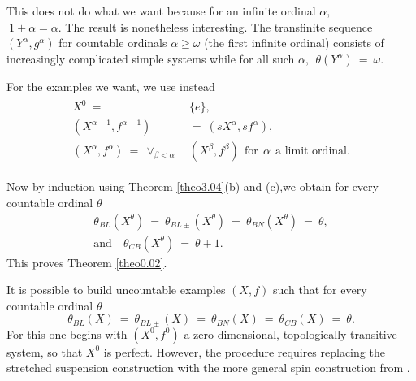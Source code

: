 \documentclass[12pt]{amsart}
\def \a {\alpha }
\def \b {\beta}
\def \om {\omega}
\def \th {\theta}
\numberwithin{equation}{section}
\begin{document}
 This does not do what we want because for an infinite ordinal $\a,$ \\ $ \ 1 + \a = \a$. The result is nonetheless interesting.
The transfinite sequence $(Y^{\a},g^{\a})$ for countable ordinals $\a \ge \om$ (the first infinite ordinal) consists of increasingly complicated
simple systems while for all such $\a, \ \ \th(Y^{\a}) \ = \ \om$.

For the examples we want, we use instead
\begin{align}\label{eq3.07}\begin{split}
X^0 \  = \ & \{ e \},  \\
(X^{\a+1},f^{\a+1}) \ & = \ (sX^{\a},sf^{\a}),  \\
(X^{\a}, f^{\a}) \  = \ \vee_{\b < \a} \  & ( X^{\b},  f^{\b}) \ \  \text{for} \ \   \a \ \ \text{a limit ordinal}.
 \end{split} \end{align}

 Now by induction using Theorem \ref{theo3.04}(b) and (c),we obtain for every countable ordinal $\th$
\begin{equation}\label{eq3.08}\begin{split}
\th_{BL}(X^{\th})\ = \ \th_{BL\pm}(X^{\th})\ = \ \th_{BN}(X^{\th}) \ = \ \th, \\
\text{and} \quad \th_{CB}(X^{\th}) \ = \ \th + 1. \hspace{2cm}
\end{split} \end{equation}
This proves Theorem \ref{theo0.02}.

It is possible to build uncountable examples $(X,f)$ such that for every countable ordinal $\th$
\begin{equation}\label{eq3.09}
\th_{BL}(X)\ = \ \th_{BL\pm}(X)\ = \ \th_{BN}(X) \ = \ \th_{CB}(X) \ = \ \th.
\end{equation}
For this one begins with $(X^0, f^0)$ a zero-dimensional, topologically transitive system, so that $X^0$ is perfect.
However, the procedure requires replacing the stretched suspension construction with the more general
spin construction from \cite{AG19}.
\end{document}
